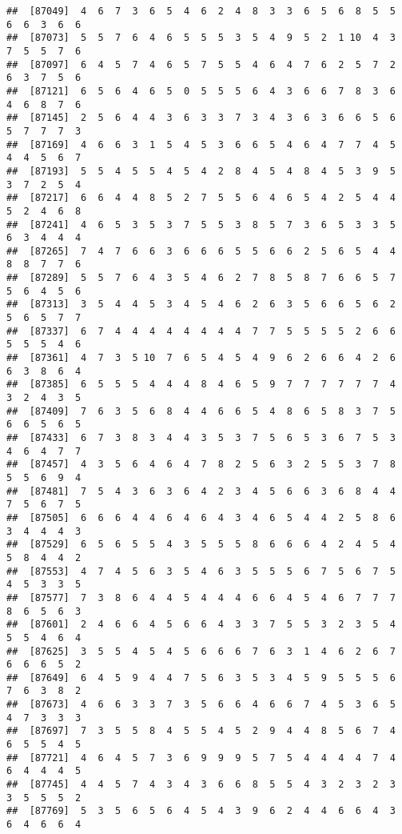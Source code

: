 \documentclass[
]{book}
\begin{document}
\begin{verbatim}
##  [87049]  4  6  7  3  6  5  4  6  2  4  8  3  3  6  5  6  8  5  5  6  6  3  6  6
##  [87073]  5  5  7  6  4  6  5  5  5  3  5  4  9  5  2  1 10  4  3  7  5  5  7  6
##  [87097]  6  4  5  7  4  6  5  7  5  5  4  6  4  7  6  2  5  7  2  6  3  7  5  6
##  [87121]  6  5  6  4  6  5  0  5  5  5  6  4  3  6  6  7  8  3  6  4  6  8  7  6
##  [87145]  2  5  6  4  4  3  6  3  3  7  3  4  3  6  3  6  6  5  6  5  7  7  7  3
##  [87169]  4  6  6  3  1  5  4  5  3  6  6  5  4  6  4  7  7  4  5  4  4  5  6  7
##  [87193]  5  5  4  5  5  4  5  4  2  8  4  5  4  8  4  5  3  9  5  3  7  2  5  4
##  [87217]  6  6  4  4  8  5  2  7  5  5  6  4  6  5  4  2  5  4  4  5  2  4  6  8
##  [87241]  4  6  5  3  5  3  7  5  5  3  8  5  7  3  6  5  3  3  5  6  3  4  4  4
##  [87265]  7  4  7  6  6  3  6  6  6  5  5  6  6  2  5  6  5  4  4  8  8  7  7  6
##  [87289]  5  5  7  6  4  3  5  4  6  2  7  8  5  8  7  6  6  5  7  5  6  4  5  6
##  [87313]  3  5  4  4  5  3  4  5  4  6  2  6  3  5  6  6  5  6  2  5  6  5  7  7
##  [87337]  6  7  4  4  4  4  4  4  4  4  7  7  5  5  5  5  2  6  6  5  5  5  4  6
##  [87361]  4  7  3  5 10  7  6  5  4  5  4  9  6  2  6  6  4  2  6  6  3  8  6  4
##  [87385]  6  5  5  5  4  4  4  8  4  6  5  9  7  7  7  7  7  7  4  3  2  4  3  5
##  [87409]  7  6  3  5  6  8  4  4  6  6  5  4  8  6  5  8  3  7  5  6  6  5  6  5
##  [87433]  6  7  3  8  3  4  4  3  5  3  7  5  6  5  3  6  7  5  3  4  6  4  7  7
##  [87457]  4  3  5  6  4  6  4  7  8  2  5  6  3  2  5  5  3  7  8  5  5  6  9  4
##  [87481]  7  5  4  3  6  3  6  4  2  3  4  5  6  6  3  6  8  4  4  7  5  6  7  5
##  [87505]  6  6  6  4  4  6  4  6  4  3  4  6  5  4  4  2  5  8  6  3  4  4  4  3
##  [87529]  6  5  6  5  5  4  3  5  5  5  8  6  6  6  4  2  4  5  4  5  8  4  4  2
##  [87553]  4  7  4  5  6  3  5  4  6  3  5  5  5  6  7  5  6  7  5  4  5  3  3  5
##  [87577]  7  3  8  6  4  4  5  4  4  4  6  6  4  5  4  6  7  7  7  8  6  5  6  3
##  [87601]  2  4  6  6  4  5  6  6  4  3  3  7  5  5  3  2  3  5  4  5  5  4  6  4
##  [87625]  3  5  5  4  5  4  5  6  6  6  7  6  3  1  4  6  2  6  7  6  6  6  5  2
##  [87649]  6  4  5  9  4  4  7  5  6  3  5  3  4  5  9  5  5  5  6  7  6  3  8  2
##  [87673]  4  6  6  3  3  7  3  5  6  6  4  6  6  7  4  5  3  6  5  4  7  3  3  3
##  [87697]  7  3  5  5  8  4  5  5  4  5  2  9  4  4  8  5  6  7  4  6  5  5  4  5
##  [87721]  4  6  4  5  7  3  6  9  9  9  5  7  5  4  4  4  4  7  4  6  4  4  4  5
##  [87745]  4  4  5  7  4  3  4  3  6  6  8  5  5  4  3  2  3  2  3  3  5  5  5  2
##  [87769]  5  3  5  6  5  6  4  5  4  3  9  6  2  4  4  6  6  4  3  6  4  6  6  4

\end{verbatim}
\end{document}
